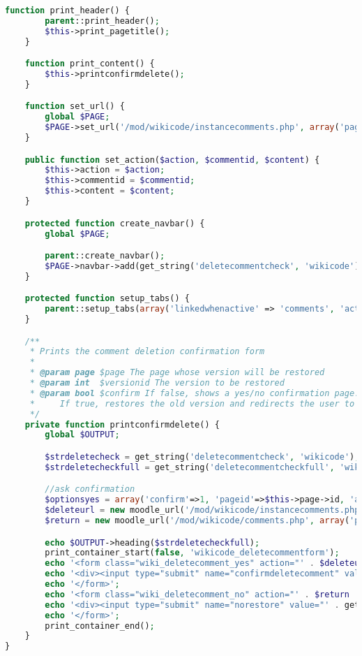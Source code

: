 \begin{lstlisting}[language=PHP]
    function print_header() {
        parent::print_header();
        $this->print_pagetitle();
    }

    function print_content() {
        $this->printconfirmdelete();
    }

    function set_url() {
        global $PAGE;
        $PAGE->set_url('/mod/wikicode/instancecomments.php', array('pageid' => $this->page->id, 'commentid' => $this->commentid));
    }

    public function set_action($action, $commentid, $content) {
        $this->action = $action;
        $this->commentid = $commentid;
        $this->content = $content;
    }

    protected function create_navbar() {
        global $PAGE;

        parent::create_navbar();
        $PAGE->navbar->add(get_string('deletecommentcheck', 'wikicode'));
    }

    protected function setup_tabs() {
        parent::setup_tabs(array('linkedwhenactive' => 'comments', 'activetab' => 'comments'));
    }

    /**
     * Prints the comment deletion confirmation form
     *
     * @param page $page The page whose version will be restored
     * @param int  $versionid The version to be restored
     * @param bool $confirm If false, shows a yes/no confirmation page.
     *     If true, restores the old version and redirects the user to the 'view' tab.
     */
    private function printconfirmdelete() {
        global $OUTPUT;

        $strdeletecheck = get_string('deletecommentcheck', 'wikicode');
        $strdeletecheckfull = get_string('deletecommentcheckfull', 'wikicode');

        //ask confirmation
        $optionsyes = array('confirm'=>1, 'pageid'=>$this->page->id, 'action'=>'delete', 'commentid'=>$this->commentid, 'sesskey'=>sesskey());
        $deleteurl = new moodle_url('/mod/wikicode/instancecomments.php', $optionsyes);
        $return = new moodle_url('/mod/wikicode/comments.php', array('pageid'=>$this->page->id));

        echo $OUTPUT->heading($strdeletecheckfull);
        print_container_start(false, 'wikicode_deletecommentform');
        echo '<form class="wiki_deletecomment_yes" action="' . $deleteurl . '" method="post" id="deletecomment">';
        echo '<div><input type="submit" name="confirmdeletecomment" value="' . get_string('yes') . '" /></div>';
        echo '</form>';
        echo '<form class="wiki_deletecomment_no" action="' . $return . '" method="post">';
        echo '<div><input type="submit" name="norestore" value="' . get_string('no') . '" /></div>';
        echo '</form>';
        print_container_end();
    }
}


\end{lstlisting}

